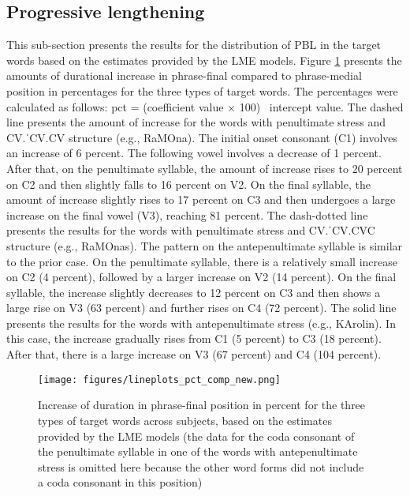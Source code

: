 \documentclass[output=paper]{langscibook}
\begin{document}
\subsection{Progressive lengthening}
This sub-section presents the results for the distribution of PBL in the target words based on the estimates provided by the LME models. Figure \ref{fig:comp} presents the amounts of durational increase in phrase-final compared to phrase-medial position in percentages for the three types of target words. The percentages were calculated as follows: pct = (coefficient value × 100) \div \ intercept value. The dashed line presents the amount of increase for the words with penultimate stress and CV.ˈCV.CV structure (e.g., RaMOna). The initial onset consonant (C1) involves an increase of 6 percent. The following vowel involves a decrease of 1 percent. After that, on the penultimate syllable, the amount of increase rises to 20 percent on C2 and then slightly falls to 16 percent on V2. On the final syllable, the amount of increase slightly rises to 17 percent on C3 and then undergoes a large increase on the final vowel (V3), reaching 81 percent. The dash-dotted line presents the results for the words with penultimate stress and CV.ˈCV.CVC structure (e.g., RaMOnas). The pattern on the antepenultimate syllable is similar to the prior case. On the penultimate syllable, there is a relatively small increase on C2 (4 percent), followed by a larger increase on V2 (14 percent). On the final syllable, the increase slightly decreases to 12 percent on C3 and then shows a large rise on V3 (63 percent) and further rises on C4 (72 percent). The solid line presents the results for the words with antepenultimate stress (e.g., KArolin). In this case, the increase gradually rises from C1 (5 percent) to C3 (18 percent). After that, there is a large increase on V3 (67 percent) and C4 (104 percent).\largerpage[-2]

\begin{figure}%
    \centering
    \texttt{[image: figures/lineplots\_pct\_comp\_new.png]}
    \caption{Increase of duration in phrase-final position in percent for the three types of target words across subjects, based on the estimates provided by the LME models (the data for the coda consonant of the penultimate syllable in one of the words with antepenultimate stress is omitted here because the other word forms did not include a coda consonant in this position)}
    \label{fig:comp}
\end{figure}
\end{document}
